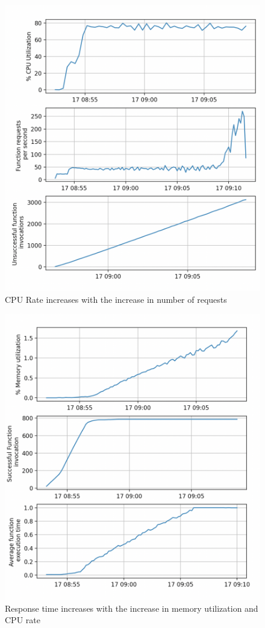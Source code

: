 \begin{figure}[htpb]
  \centering
  \includegraphics[width=1\textwidth]{figures/graph2}
  \caption{CPU Rate increases with the increase in number of requests} \label{fig:tumslide}
\end{figure}

\begin{figure}[htpb]
  \centering
  \includegraphics[width=1\textwidth]{figures/graph1}
  \caption{Response time increases with the increase in memory utilization and CPU rate} \label{fig:tumslide}
\end{figure}


